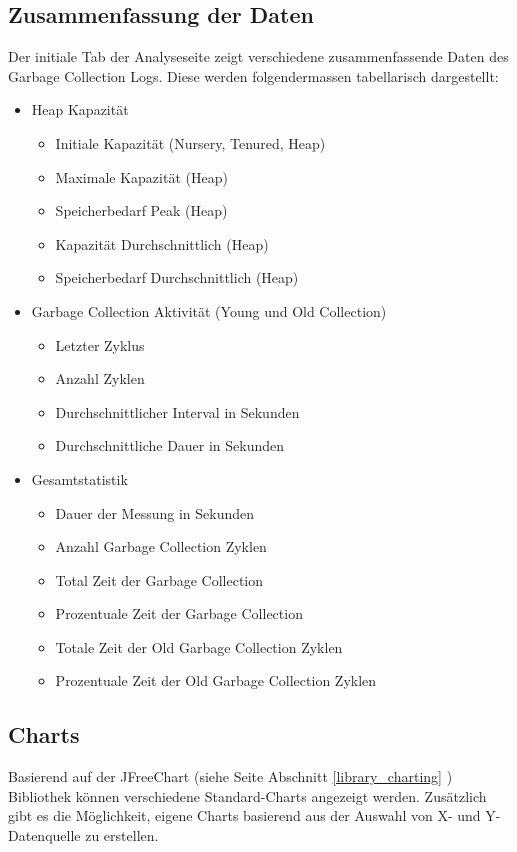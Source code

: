 \subsection{Zusammenfassung der Daten}
Der initiale Tab der Analyseseite zeigt verschiedene zusammenfassende Daten des Garbage Collection Logs. Diese werden folgendermassen tabellarisch dargestellt:
\begin{itemize}
	\item Heap Kapazität
	\begin{itemize}
		\item Initiale Kapazität (Nursery, Tenured, Heap)
		\item Maximale Kapazität (Heap)
		\item Speicherbedarf Peak (Heap)
		\item Kapazität Durchschnittlich (Heap)
		\item Speicherbedarf Durchschnittlich (Heap)
	\end{itemize}
	\item Garbage Collection Aktivität (Young und Old Collection)
	\begin{itemize}
		\item Letzter Zyklus
		\item Anzahl Zyklen
		\item Durchschnittlicher Interval in Sekunden
		\item Durchschnittliche Dauer in Sekunden		
	\end{itemize}	
	\item Gesamtstatistik
	\begin{itemize}
		\item Dauer der Messung in Sekunden
		\item Anzahl Garbage Collection Zyklen
		\item Total Zeit der Garbage Collection
		\item Prozentuale Zeit der Garbage Collection
		\item Totale Zeit der Old Garbage Collection Zyklen
		\item Prozentuale Zeit der Old Garbage Collection Zyklen
	\end{itemize}
\end{itemize}

\subsection{Charts}
Basierend auf der JFreeChart (siehe Seite \pageref{library_charting} Abschnitt \ref{library_charting} ) Bibliothek können verschiedene Standard-Charts angezeigt werden. Zusätzlich gibt es die Möglichkeit, eigene Charts basierend aus der Auswahl von X- und Y-Datenquelle zu erstellen. 

